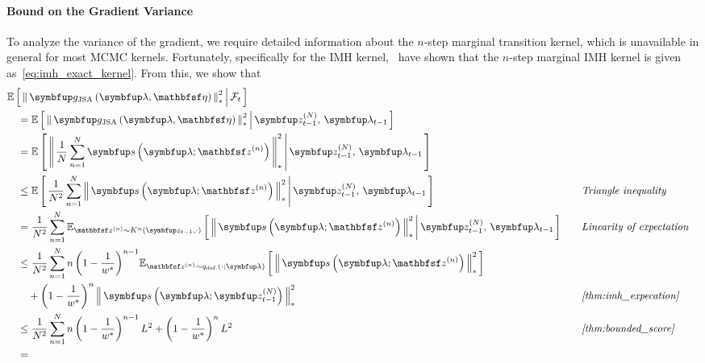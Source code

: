 \begin{proofEnd}
  \paragraph{\textbf{Bound on the Gradient Variance}}
  To analyze the variance of the gradient, we require detailed information about the \(n\)-step marginal transition kernel, which is unavailable in general for most MCMC kernels.
  Fortunately, specifically for the IMH kernel,~\citet{Smith96exacttransition} have shown that the \(n\)-step marginal IMH kernel is given as~\cref{eq:imh_exact_kernel}.
  From this, we show that
  \begin{alignat}{2}
    &\E{ \norm{ \vg_{\mathrm{JSA}}\left(\vlambda, \rvveta\right) }^2_{*} \,\middle|\, \mathcal{F}_{t} }
    \nonumber
    \\
    &\quad=
    \E{ \norm{ \vg_{\mathrm{JSA}}\left(\vlambda, \rvveta\right) }^2_{*} \,\middle|\, \vz_{t-1}^{(N)},\, \vlambda_{t-1} }
    \nonumber
    \\
    &\quad=
    \E{ \norm{ \frac{1}{N}\sum^{N}_{n=1} \vs\left(\vlambda; \rvvz^{(n)}\right) }^2_{*} \,\middle|\, \vz_{t-1}^{(N)},\, \vlambda_{t-1} }
    \nonumber
    \\
    &\quad\leq
    \E{ \frac{1}{N^2} \sum^{N}_{n=1} \norm{\vs\left(\vlambda; \rvvz^{(n)}\right) }^2_{*} \,\middle|\, \vz_{t-1}^{(N)},\, \vlambda_{t-1} }
    &&\quad\text{\textit{Triangle inequality}}
    \nonumber
    \\
    &\quad=
    \frac{1}{N^2}\sum^{N}_{n=1} \Esub{\rvvz^{(n)} \sim K^n\left(\vz_{t-1}, \cdot\right)}{ \norm{\vs\left(\vlambda; \rvvz^{(n)}\right) }^2_{*} \,\middle|\,  \vz_{t-1}^{(N)},\, \vlambda_{t-1} }
    &&\quad\text{\textit{Linearity of expectation}}
    \nonumber
    \\
    &\quad\leq
    \frac{1}{N^2}\sum^{N}_{n=1}
      n \, {\left(1 - \frac{1}{w^*}\right)}^{n-1}
      \Esub{\rvvz^{(n)} \sim q_{\text{def.}}\left(\cdot; \vlambda\right)}{ \norm{\vs\left(\vlambda; \rvvz^{(n)} \right)}_{*}^2 }
      \nonumber
      \\
      &\qquad+ 
        {\left(1 - \frac{1}{w^*}\right)}^{n} \, \norm{\vs\left(\vlambda; \vz_{t-1}^{(N)} \right)}_{*}^2
    &&\quad\text{\textit{\cref{thm:imh_expecation}}}
    \nonumber
    \\
    &\quad\leq
    \frac{1}{N^2}\sum^{N}_{n=1}
      n \, {\left(1 - \frac{1}{w^*}\right)}^{n-1}  \, L^2
      +
      {\left(1 - \frac{1}{w^*}\right)}^{n} \, L^2
    &&\quad\text{\textit{\cref{thm:bounded_score}}}
    \nonumber
    \\
    &\quad=

\end{alignat}
\end{proofEnd}
